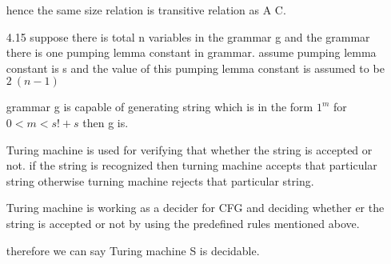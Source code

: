 \documentclass[11pt]{article}
\theoremstyle{thmstyle}
\begin{document}
\begin{itemize}
hence the same size relation is transitive relation as A C. 

\item[4.15] suppose there is total n variables in the grammar g and the grammar there is one pumping lemma constant in grammar. assume pumping lemma constant is s and the value of this pumping lemma constant is assumed to be $2^\ (n-1)$

grammar g is capable of generating string which is in the form $1^m$ for $0 < m < s ! + s$ then g is.

Turing machine is used for verifying that whether the string is accepted or not. if the string is recognized then turning machine accepts that particular string otherwise turning machine rejects that particular string.


Turing machine is working as a decider for CFG and deciding whether er the string is accepted or not by using the predefined rules mentioned above. 

therefore we can say Turing machine S is decidable.
\end{itemize}
\end{document}
